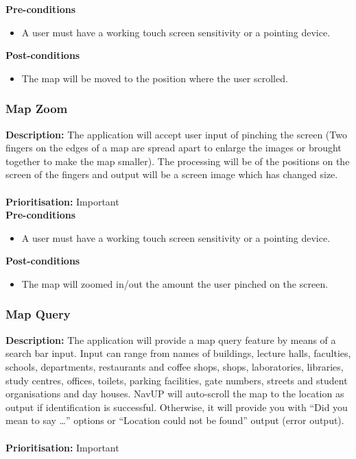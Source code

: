 \documentclass[runningheads,a4paper]{article}
\begin{document}
  
\textbf{Pre-conditions}
\begin{itemize}
 	\item A user must have a working touch screen sensitivity or a pointing device.
\end{itemize}
  
\textbf{Post-conditions}
\begin{itemize}
	\item The map will be moved to the position where the user scrolled. 
\end{itemize}

\subsubsection{Map Zoom}

\textbf{Description:}  The application will accept user input of pinching the screen (Two fingers on the edges of a map are spread apart to enlarge the images or brought together to make the map smaller). The processing will be of the positions on the screen of the fingers and output will be a screen image which has changed size.\\\\
\noindent
\textbf{Prioritisation:} Important\\
  
  
\textbf{Pre-conditions}
\begin{itemize}
 	\item A user must have a working touch screen sensitivity or a pointing device.
\end{itemize}
  
\textbf{Post-conditions}
\begin{itemize}
	\item The map will zoomed in/out the amount the user pinched on the screen. 
\end{itemize}

\subsubsection{Map Query}

\textbf{Description:}  The application will provide a map query feature by means of a search bar input. Input can range from names of buildings, lecture halls, faculties, schools, departments, restaurants and coffee shops, shops, laboratories, libraries, study centres, offices, toilets,  parking facilities, gate numbers, streets and student organisations and day houses. NavUP will auto-scroll the map to the location as output if identification is successful. Otherwise, it will provide you with “Did you mean to say …” options or “Location could not be found” output (error output).\\\\
\noindent
\textbf{Prioritisation:} Important\\
  
\end{document}
